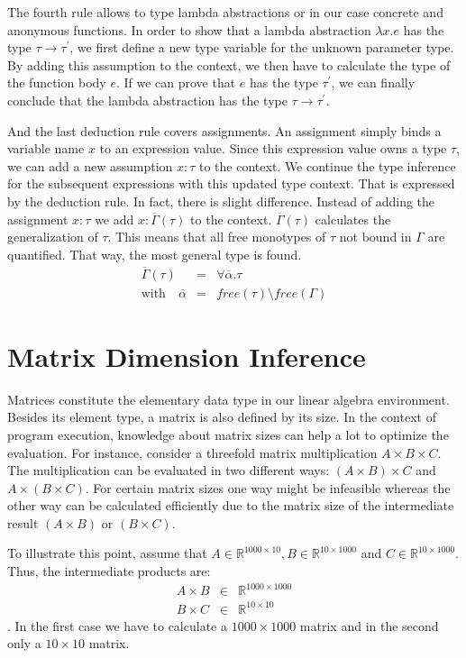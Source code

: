 The fourth rule allows to type lambda abstractions or in our case concrete and anonymous functions.
In order to show that a lambda abstraction $\lambda x.e$ has the type $\tau\rightarrow \tau^\prime$, we first define a new type variable for the unknown parameter type.
By adding this assumption to the context, we then have to calculate the type of the function body $e$.
If we can prove that $e$ has the type $\tau^\prime$, we can finally conclude that the lambda abstraction has the type $\tau \rightarrow \tau^\prime$.

And the last deduction rule covers assignments.
An assignment simply binds a variable name $x$ to an expression value.
Since this expression value owns a type $\tau$, we can add a new assumption $x:\tau$ to the context.
We continue the type inference for the subsequent expressions with this updated type context.
That is expressed by the deduction rule.
In fact, there is slight difference.
Instead of adding the assignment $x:\tau$ we add $x:\overline{\Gamma}(\tau)$ to the context.
$\overline{\Gamma}(\tau)$ calculates the generalization of $\tau$.
This means that all free monotypes of $\tau$ not bound in $\Gamma$ are quantified.
That way, the most general type is found.
\begin{eqnarray*}
	\overline{\Gamma}(\tau) &=& \forall \overline{\alpha}. \tau\\
	\text{with}\quad\overline{\alpha} &=& free(\tau) \setminus free(\Gamma)
\end{eqnarray*}

\section{Matrix Dimension Inference}
\label{sec:MatrixDimensionInference}

Matrices constitute the elementary data type in our linear algebra environment.
Besides its element type, a matrix is also defined by its size.
In the context of program execution, knowledge about matrix sizes can help a lot to optimize the evaluation.
For instance, consider a threefold matrix multiplication $A\times B\times C$.
The multiplication can be evaluated in two different ways: $(A\times B)\times C$ and $A\times(B\times C)$.
For certain matrix sizes one way might be infeasible whereas the other way can be calculated efficiently due to the matrix size of the intermediate result $(A\times B)$ or $(B\times C)$.

To illustrate this point, assume that $A\in \mathbb{R}^{1000\times 10}, B\in \mathbb{R}^{10\times 1000}$ and $C \in \mathbb{R}^{10\times 1000}$.
Thus, the intermediate products are:
\begin{eqnarray*}
	A\times B &\in& \mathbb{R}^{1000 \times 1000}\\
	B\times C &\in& \mathbb{R}^{10 \times 10}
\end{eqnarray*}
.
In the first case we have to calculate a $1000 \times 1000$ matrix and in the second only a $10 \times 10$ matrix.

